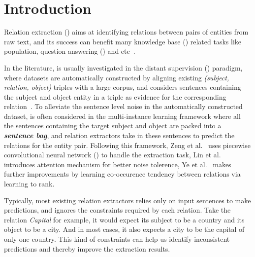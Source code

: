 \section{Introduction}

Relation extraction (\RE) aims at identifying relations between pairs of entities from raw text, and its success can benefit  many knowledge base (\KB) related tasks like \KB population, question answering (\QA) and etc~\cite{suchanek2013advances}.

In the literature, \RE is usually investigated in the distant supervision (\DS) paradigm, where datasets are automatically constructed by aligning existing \KB \emph{(subject, relation, object)} triples with a large corpus, and considers sentences containing the subject and object entity in a triple as evidence for the corresponding relation~\cite{riedel2010modeling}.
To alleviate the sentence level noise in the automatically constructed dataset, \RE is often considered in the multi-instance learning framework where all the sentences containing the target subject and object are packed into a \textbf{\emph{sentence bag}}, and relation extractors take in these sentences to predict the relations for the entity pair. 
Following this framework, Zeng et al.~ uses piecewise convolutional neural network (\PCNN) to handle the extraction task, Lin et al.~ introduces attention mechanism for better noise tolerence,
Ye et al.~ makes further improvements by learning co-occurence tendency between relations via learning to rank.

Typically, most existing relation extractors relies only on input sentences to make predictions, and ignores the constraints required by each relation.
Take the relation \emph{Capital} for example, it would expect its subject to be a country and its object to be a city.
And in most cases, it also expects a city to be the capital of only one country.
This kind of constraints can help us identify inconsistent predictions and thereby improve the extraction results.

